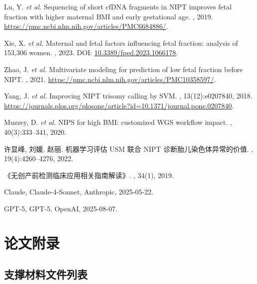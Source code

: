 \documentclass[withoutpreface]{cumcmthesis}
\begin{document}
\begin{thebibliography}{99}

Lu, Y. \emph{et al.}
\newblock Sequencing of short cfDNA fragments in NIPT improves fetal fraction with higher maternal BMI and early gestational age.
, 2019.
\newblock \url{https://pmc.ncbi.nlm.nih.gov/articles/PMC6684886/}.

Xie, X. \emph{et al.}
\newblock Maternal and fetal factors influencing fetal fraction: analysis of 153,306 women.
, 2023.
\newblock DOI: \href{https://doi.org/10.3389/fped.2023.1066178}{10.3389/fped.2023.1066178}.

Zhao, J. \emph{et al.}
\newblock Multivariate modeling for prediction of low fetal fraction before NIPT.
, 2021.
\newblock \url{https://pmc.ncbi.nlm.nih.gov/articles/PMC10358597/}.

Yang, J. \emph{et al.}
\newblock Improving NIPT trisomy calling by SVM.
, 13(12):e0207840, 2018.
\newblock \url{https://journals.plos.org/plosone/article?id=10.1371/journal.pone.0207840}.

Muzzey, D. \emph{et al.}
\newblock NIPS for high BMI: customized WGS workflow impact.
, 40(3):333--341, 2020.

许显峰, 刘媛, 赵丽.
\newblock 机器学习评估 USM 联合 NIPT 诊断胎儿染色体异常的价值.
, 19(4):4260--4276, 2022.

《无创产前检测临床应用相关指南解读》.
, 34(1), 2019.

Claude, Claude-4-Sonnet, Anthropic, 2025-05-22.

GPT-5, GPT-5, OpenAI, 2025-08-07.

\end{thebibliography}

\newpage
\section{论文附录}

\subsection{支撑材料文件列表}
\end{document}

